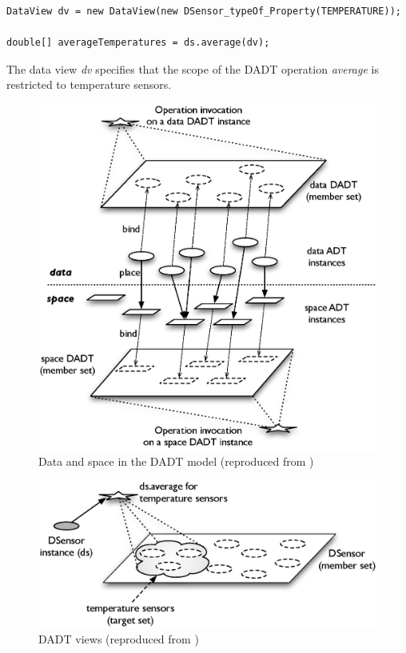 \begin{lstlisting}[frame=trbl, basewidth={0.55em, 0.6em}, captionpos=b, 
basicstyle=\ttfamily\footnotesize, breaklines, caption = Definition and use of DADT Data View, label = listing:views ]  
DataView dv = new DataView(new DSensor_typeOf_Property(TEMPERATURE));

double[] averageTemperatures = ds.average(dv);
\end{lstlisting}

The data view \emph{dv} specifies that the scope of the DADT operation
\emph{average} is restricted to temperature sensors.

\begin{figure}
\centering
\label{Fig:DADTs}
\includegraphics[scale=0.50]{img/DADTs.eps} \caption[Data and space in the DADT 
model]{Data and space in the DADT model (reproduced from 
\cite{migliavacca_DADT:2006})}
\end{figure}

\begin{figure}
\centering
\label{Fig:DADT_Views}
\includegraphics[scale=0.50]{img/DADT_Views.eps} \caption[DADT views]{DADT views
(reproduced from 
\cite{migliavacca_DADT:2006})}
\end{figure}

